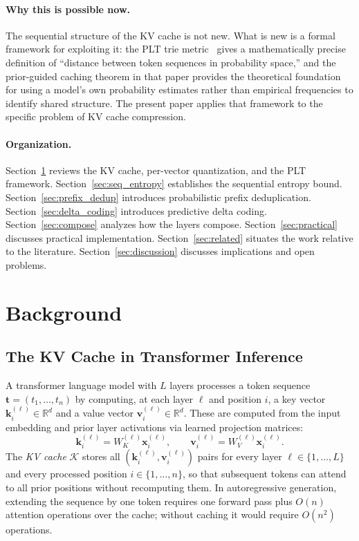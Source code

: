 \documentclass[11pt]{article}
\begin{document}
\paragraph{Why this is possible now.}
The sequential structure of the KV cache is not new.  What is new is a formal
framework for exploiting it: the PLT trie metric~\cite{plt2026} gives a
mathematically precise definition of ``distance between token sequences in
probability space,'' and the prior-guided caching theorem in that paper provides
the theoretical foundation for using a model's own probability estimates rather
than empirical frequencies to identify shared structure.  The present paper applies
that framework to the specific problem of KV cache compression.

\paragraph{Organization.}
Section~\ref{sec:background} reviews the KV cache, per-vector quantization, and
the PLT framework.  Section~\ref{sec:seq_entropy} establishes the sequential
entropy bound.  Section~\ref{sec:prefix_dedup} introduces probabilistic prefix
deduplication.  Section~\ref{sec:delta_coding} introduces predictive delta coding.
Section~\ref{sec:compose} analyzes how the layers compose.
Section~\ref{sec:practical} discusses practical implementation.
Section~\ref{sec:related} situates the work relative to the literature.
Section~\ref{sec:discussion} discusses implications and open problems.

\section{Background}
\label{sec:background}

\subsection{The KV Cache in Transformer Inference}

A transformer language model with $L$ layers processes a token sequence
$\mathbf{t} = (t_1, \ldots, t_n)$ by computing, at each layer $\ell$ and
position $i$, a key vector $\mathbf{k}^{(\ell)}_i \in \mathbb{R}^d$ and a value
vector $\mathbf{v}^{(\ell)}_i \in \mathbb{R}^d$.  These are computed from the
input embedding and prior layer activations via learned projection matrices:
\[
  \mathbf{k}^{(\ell)}_i = W_K^{(\ell)} \mathbf{x}^{(\ell)}_i,
  \qquad
  \mathbf{v}^{(\ell)}_i = W_V^{(\ell)} \mathbf{x}^{(\ell)}_i.
\]
The \emph{KV cache} $\mathcal{K}$ stores all $(\mathbf{k}^{(\ell)}_i, \mathbf{v}^{(\ell)}_i)$
pairs for every layer $\ell \in \{1,\ldots,L\}$ and every processed position
$i \in \{1,\ldots,n\}$, so that subsequent tokens can attend to all prior
positions without recomputing them.  In autoregressive generation, extending the
sequence by one token requires one forward pass plus $O(n)$ attention operations
over the cache; without caching it would require $O(n^2)$ operations.
\end{document}
